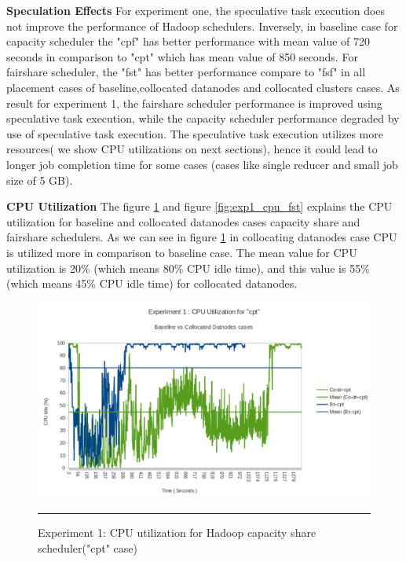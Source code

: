 \textbf{Speculation Effects }  For experiment one,  the speculative task execution does not improve the performance of Hadoop schedulers. Inversely, in baseline case for capacity scheduler the "cpf"‌ has better performance with mean value of 720 seconds in comparison to "cpt" which has mean value of 850 seconds. For fairshare scheduler, the "fst" has better performance compare to "fsf" in all placement cases of baseline,collocated datanodes and collocated clusters cases. As result for experiment 1,  the fairshare scheduler performance is improved using speculative task execution, while the capacity scheduler performance degraded by use of speculative task execution. The speculative task execution utilizes more resources( we show CPU utilizations on next sections), hence it could lead to longer job completion time for some cases (cases like single reducer and small job size of 5 GB). 




\textbf{CPU Utilization} The figure \ref{fig:exp1_cpu_cpt} and figure \ref{fig:exp1_cpu_fst} explains the CPU utilization for baseline and collocated datanodes cases capacity share and fairshare schedulers. As we can see in figure \ref{fig:exp1_cpu_cpt} in collocating datanodes case CPU is utilized more in comparison to baseline case. The mean value for CPU utilization is 20\% (which means 80\% CPU idle time), and this value is 55\% (which means 45\% CPU idle time) for collocated datanodes.  \\ 

 \begin{figure}[htbp]
  \centering
    \includegraphics[width=\textwidth,height=\textheight,keepaspectratio]{./Figures/exp1_cpu_cpt.pdf}
    \rule{35em}{0.5pt}
  \caption{Experiment 1: CPU‌ utilization for Hadoop capacity share scheduler("cpt" case)}
  \label{fig:exp1_cpu_cpt}
\end{figure}  

